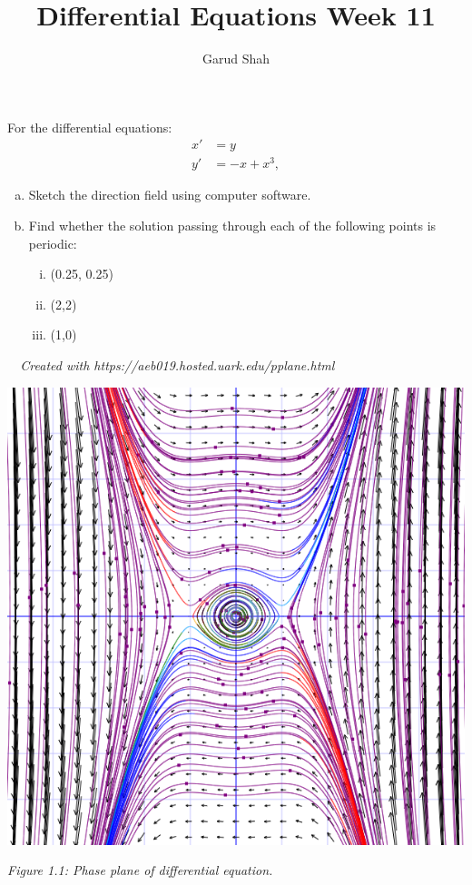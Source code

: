 \documentclass[11pt]{article}
\title{Differential Equations Week \textbf{11}}
\author{Garud Shah}
\begin{document}
    \maketitle \newpage 
    \begin{problem}[Problem 1]
        \setcounter{equation}{-1} \break
        For the differential equations:
        \begin{align}
            x' &= y \\
            y' &= -x + x^3,
        \end{align}
        \begin{enumerate}[(a)]
            \item Sketch the direction field using computer software.
            \item Find whether the solution passing through each of the following points is periodic:
            \begin{enumerate}[i.]
                \item (0.25, 0.25)
                \item (2,2)
                \item (1,0)
            \end{enumerate}
        \end{enumerate}
    \end{problem}
    \begin{solution} 
        \textit{$\text{ }$ \newline Created with https://aeb019.hosted.uark.edu/pplane.html}
        \begin{center}
            \includegraphics[scale=0.3]{1.png}
        \end{center}
        \begin{center}
            \textit{Figure 1.1: Phase plane of differential equation.}
        \end{center}
    \end{solution}
\end{document}
